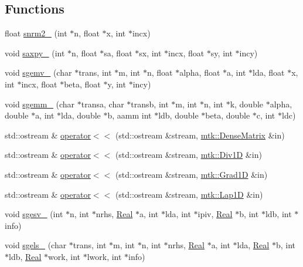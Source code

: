 \subsection*{Functions}
\begin{DoxyCompactItemize}
\item 
float \hyperlink{namespacemtk_a508e99fcb14d526bc43aa0a80aa4b658}{snrm2\-\_\-} (int $\ast$n, float $\ast$x, int $\ast$incx)
\item 
void \hyperlink{namespacemtk_a81a2d7d1ea9eff65ae13646c93dad5e9}{saxpy\-\_\-} (int $\ast$n, float $\ast$sa, float $\ast$sx, int $\ast$incx, float $\ast$sy, int $\ast$incy)
\item 
void \hyperlink{namespacemtk_a88daff7ad6f251a58b94aa2d0c94d069}{sgemv\-\_\-} (char $\ast$trans, int $\ast$m, int $\ast$n, float $\ast$alpha, float $\ast$a, int $\ast$lda, float $\ast$x, int $\ast$incx, float $\ast$beta, float $\ast$y, int $\ast$incy)
\item 
void \hyperlink{namespacemtk_adb7c0560326b8e57f255e58b87ec76b0}{sgemm\-\_\-} (char $\ast$transa, char $\ast$transb, int $\ast$m, int $\ast$n, int $\ast$k, double $\ast$alpha, double $\ast$a, int $\ast$lda, double $\ast$b, aamm int $\ast$ldb, double $\ast$beta, double $\ast$c, int $\ast$ldc)
\item 
std\-::ostream \& \hyperlink{namespacemtk_ad3bcf52cda59ddb5fc7b4bdce76c46dc}{operator$<$$<$} (std\-::ostream \&stream, \hyperlink{classmtk_1_1DenseMatrix}{mtk\-::\-Dense\-Matrix} \&in)
\item 
std\-::ostream \& \hyperlink{namespacemtk_a12db5e6fff3788f728819a60d5c28d01}{operator$<$$<$} (std\-::ostream \&stream, \hyperlink{classmtk_1_1Div1D}{mtk\-::\-Div1\-D} \&in)
\item 
std\-::ostream \& \hyperlink{namespacemtk_a3f546b8a3743b8719db17e33f2d7ef7f}{operator$<$$<$} (std\-::ostream \&stream, \hyperlink{classmtk_1_1Grad1D}{mtk\-::\-Grad1\-D} \&in)
\item 
std\-::ostream \& \hyperlink{namespacemtk_af667c01a388ef1815d549b09b2d76bcc}{operator$<$$<$} (std\-::ostream \&stream, \hyperlink{classmtk_1_1Lap1D}{mtk\-::\-Lap1\-D} \&in)
\item 
void \hyperlink{namespacemtk_ae1d63c7ae73b3c48e0dca81eb19039f3}{sgesv\-\_\-} (int $\ast$n, int $\ast$nrhs, \hyperlink{group__c01-roots_gac080bbbf5cbb5502c9f00405f894857d}{Real} $\ast$a, int $\ast$lda, int $\ast$ipiv, \hyperlink{group__c01-roots_gac080bbbf5cbb5502c9f00405f894857d}{Real} $\ast$b, int $\ast$ldb, int $\ast$info)
\item 
void \hyperlink{namespacemtk_ada6df1b733204aa7ff0b1ec7556288f9}{sgels\-\_\-} (char $\ast$trans, int $\ast$m, int $\ast$n, int $\ast$nrhs, \hyperlink{group__c01-roots_gac080bbbf5cbb5502c9f00405f894857d}{Real} $\ast$a, int $\ast$lda, \hyperlink{group__c01-roots_gac080bbbf5cbb5502c9f00405f894857d}{Real} $\ast$b, int $\ast$ldb, \hyperlink{group__c01-roots_gac080bbbf5cbb5502c9f00405f894857d}{Real} $\ast$work, int $\ast$lwork, int $\ast$info)

\end{DoxyCompactItemize}
